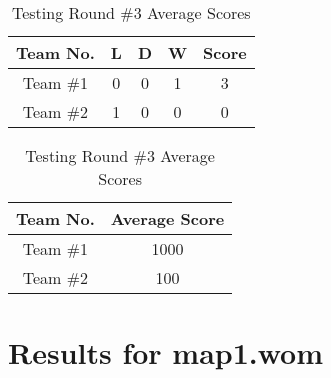 \documentclass[a4paper,10pt]{article}
\begin{document}
\begin{table}[ht]
\begin{minipage}[b]{0.5\linewidth}\centering
\caption{Testing Round \#3 Overview}
\begin{tabular}{|c|c|c|c|c|}
\hline
\textbf{Team No.} & \textbf{L} & \textbf{D} & \textbf{W} & \textbf{Score} \\
\hline
\hline
Team \#1 & 0 & 0 & 1 & 3 \\
\hline
Team \#2 & 1 & 0 & 0 & 0 \\
\hline
\end{tabular}
\label{table:overview}
\end{minipage}
\hspace{0.5cm}
\begin{minipage}[b]{0.5\linewidth}\centering
\caption{Testing Round \#3 Average Scores}
\label{table:average}
\begin{tabular}{|c|c|}
\hline
\textbf{Team No.} & \textbf{Average Score} \\
\hline
\hline
Team \#1 & 1000 \\
\hline
Team \#2 & 100 \\
\hline
\end{tabular}
\end{minipage}
\end{table}



\section{Results for map1.wom}
\label{sec:map1.wom}
\end{document}
